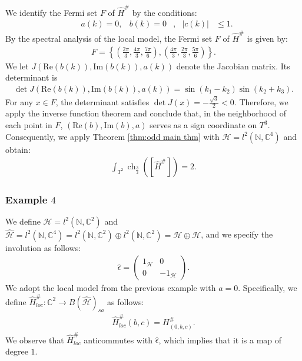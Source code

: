 \documentclass{amsart}
\theoremstyle{definition}
\theoremstyle{remark}
\begin{document}
We identify the Fermi set $F$ of $\hat{H}^{\#}$ by the conditions:
\begin{align*}
    &a(k) = 0,&b(k)= 0&, &\lvert c(k) \rvert &\leq 1.
\end{align*}
By the spectral analysis of the local model, the Fermi set $F$ of $\hat{H}^{\#}$ is given by:
\begin{align*}
    F = \left\{ \left( \frac{2\pi}{3}, \frac{4\pi}{3}, \frac{7\pi}{6} \right), \left( \frac{4\pi}{3}, \frac{2\pi}{3}, \frac{5\pi}{6} \right) \right\}.
\end{align*}
We let $J(\text{Re}(b(k)), \text{Im}(b(k)), a(k))$ denote the Jacobian matrix. Its determinant is
\begin{align*}
    \det J(\text{Re}(b(k)), \text{Im}(b(k)), a(k)) = \sin(k_1 - k_2) \sin(k_2 + k_3).
\end{align*}
For any $x \in F$, the determinant satisfies $\det J(x) = -\frac{\sqrt{3}}{2} < 0$.
Therefore, we apply the inverse function theorem and conclude that, in the neighborhood of each point in $F$, $(\text{Re}(b), \text{Im}(b), a)$ serves as a sign coordinate on $T^3$.
Consequently, we apply Theorem \ref{thm:odd main thm} with $\mathcal{H} = l^2(\mathbb{N}, \mathbb{C}^4)$ and obtain:
\begin{align*}
    \int_{T^3} \operatorname{ch}_{\frac{3}{2}}([\hat{H}^{\#}]) = 2.
\end{align*}

\subsubsection{Example $4$}
\label{subsubsec:example4}

We define $\mathcal{H} = l^2(\mathbb{N}, \mathbb{C}^2)$ and 
$\hat{\mathcal{H}} = l^2(\mathbb{N}, \mathbb{C}^4) = l^2(\mathbb{N}, \mathbb{C}^2) \oplus l^2(\mathbb{N}, \mathbb{C}^2) = \mathcal{H} \oplus \mathcal{H}$, 
and we specify the involution as follows:
\begin{align*}
    \hat{\epsilon} = 
    \begin{pmatrix}
        1_{\mathcal{H}} & 0 \\
        0 & -1_{\mathcal{H}}
    \end{pmatrix}.
\end{align*}
We adopt the local model from the previous example with $a = 0$. 
Specifically, we define $\hat{H}^{\#}_{loc} \colon \mathbb{C}^2 \to B(\hat{\mathcal{H}})_{sa}$ as follows:
\begin{align*}
    \hat{H}^{\#}_{loc}(b, c) = H^{\#}_{(0, b, c)}.
\end{align*}
We observe that $\hat{H}^{\#}_{loc}$ anticommutes with $\hat{\epsilon}$,
which implies that it is a map of degree $1$.
\end{document}
